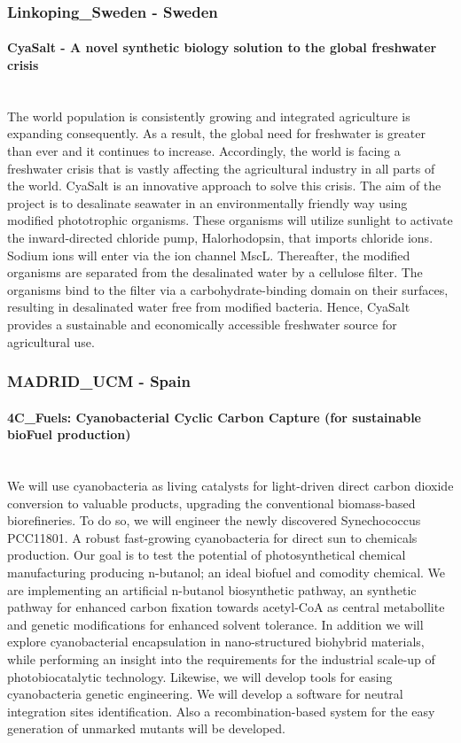 \subsubsection*{Linkoping\_Sweden - Sweden} 
\paragraph{CyaSalt - A novel synthetic biology solution to the global freshwater crisis} \mbox{} \\
The world population is consistently growing and integrated agriculture is expanding consequently. As a result, the global need for freshwater is greater than ever and it continues to increase. Accordingly, the world is facing a freshwater crisis that is vastly affecting the agricultural industry in all parts of the world. CyaSalt is an innovative approach to solve this crisis. The aim of the project is to desalinate seawater in an environmentally friendly way using modified phototrophic organisms. These organisms will utilize sunlight to activate the inward-directed chloride pump, Halorhodopsin, that imports chloride ions. Sodium ions will enter via the ion channel MscL. Thereafter, the modified organisms are separated from the desalinated water by a cellulose filter. The organisms bind to the filter via a carbohydrate-binding domain on their surfaces, resulting in desalinated water free from modified bacteria. Hence, CyaSalt provides a sustainable and economically accessible freshwater source for agricultural use.
\pagebreak
\subsubsection*{MADRID\_UCM - Spain}
\paragraph{4C\_Fuels: Cyanobacterial Cyclic Carbon Capture (for sustainable bioFuel production)}\mbox{} \\
We will use cyanobacteria as living catalysts for light-driven direct carbon dioxide conversion to valuable products, upgrading the conventional biomass-based biorefineries. To do so, we will engineer the newly discovered Synechococcus PCC11801. A robust fast-growing cyanobacteria for direct sun to chemicals production. Our goal is to test the potential of photosynthetical chemical manufacturing producing n-butanol; an ideal biofuel and comodity chemical. We are implementing an artificial n-butanol biosynthetic pathway, an synthetic pathway for enhanced carbon fixation towards acetyl-CoA as central metabollite and genetic modifications for enhanced solvent tolerance. In addition we will explore cyanobacterial encapsulation in nano-structured biohybrid materials, while performing an insight into the requirements for the industrial scale-up of photobiocatalytic technology. Likewise, we will develop tools for easing cyanobacteria genetic engineering. We will develop a software for neutral integration sites identification. Also a recombination-based system for the easy generation of unmarked mutants will be developed.

